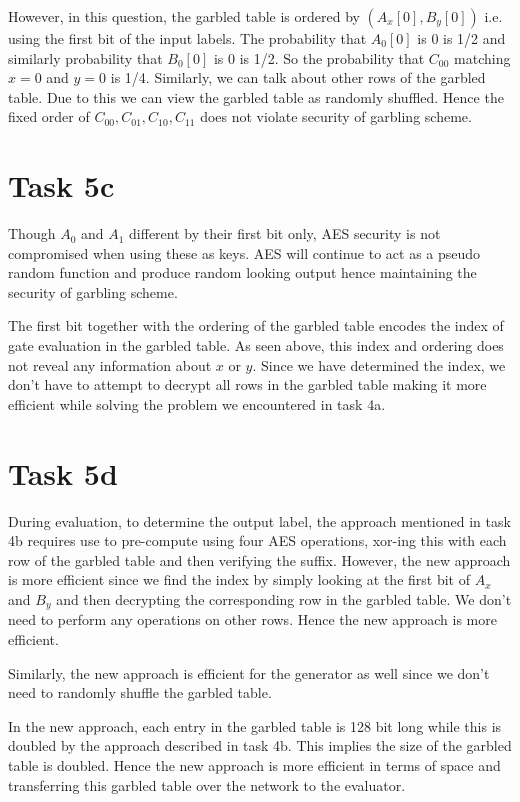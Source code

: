 \documentclass{article}
\begin{document}
    However, in this question, the garbled table is ordered by $(A_x[0], B_y[0])$ i.e. using the first bit of the input labels. The probability that $A_0[0]$ is 0 is 1/2 and similarly probability that $B_0[0]$ is 0 is 1/2. So the probability that $C_{00}$ matching $x = 0$ and $y = 0$ is 1/4. Similarly, we can talk about other rows of the garbled table. Due to this we can view the garbled table as randomly shuffled. Hence the fixed order of $C_{00}, C_{01}, C_{10}, C_{11}$ does not violate security of garbling scheme.

    \section*{Task 5c}
    Though $A_0$ and $A_1$ different by their first bit only, AES security is not compromised when using these as keys. AES will continue to act as a pseudo random function and produce random looking output hence maintaining the security of garbling scheme.

    The first bit together with the ordering of the garbled table encodes the index of gate evaluation in the garbled table. As seen above, this index and ordering does not reveal any information about $x$ or $y$. Since we have determined the index, we don't have to attempt to decrypt all rows in the garbled table making it more efficient while solving the problem we encountered in task 4a.

    \section*{Task 5d}
    During evaluation, to determine the output label, the approach mentioned in task 4b requires use to pre-compute using four AES operations, xor-ing this with each row of the garbled table and then verifying the suffix. However, the new approach is more efficient since we find the index by simply looking at the first bit of $A_x$ and $B_y$ and then decrypting the corresponding row in the garbled table. We don't need to perform any operations on other rows. Hence the new approach is more efficient.

    Similarly, the new approach is efficient for the generator as well since we don't need to randomly shuffle the garbled table.

    In the new approach, each entry in the garbled table is 128 bit long while this is doubled by the approach described in task 4b. This implies the size of the garbled table is doubled. Hence the new approach is more efficient in terms of space and transferring this garbled table over the network to the evaluator.
    
\end{document}

